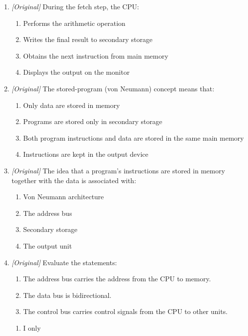 \begin{enumerate}[label=\textbf{Q\arabic*.}, leftmargin=*]
\begin{enumerate}[label=\Alph*.]
    \item Fetch, decode, execute
  \end{enumerate}
\item \textit{[Original]} During the fetch step, the CPU:
  \begin{enumerate}[label=\Alph*.]
    \item Performs the arithmetic operation
    \item Writes the final result to secondary storage
    \item Obtains the next instruction from main memory
    \item Displays the output on the monitor
  \end{enumerate}
\item \textit{[Original]} The stored-program (von Neumann) concept means
  that:
  \begin{enumerate}[label=\Alph*.]
    \item Only data are stored in memory
    \item Programs are stored only in secondary storage
    \item Both program instructions and data are stored in the same main
      memory
    \item Instructions are kept in the output device
  \end{enumerate}
\item \textit{[Original]} The idea that a program's instructions are stored
  in memory together with the data is associated with:
  \begin{enumerate}[label=\Alph*.]
    \item Von Neumann architecture
    \item The address bus
    \item Secondary storage
    \item The output unit
  \end{enumerate}
\item \textit{[Original]} Evaluate the statements:
  \begin{enumerate}[label=\Roman*.]
    \item The address bus carries the address from the CPU to memory.
    \item The data bus is bidirectional.
    \item The control bus carries control signals from the CPU to other
      units.
  \end{enumerate}
  \begin{enumerate}[label=\Alph*.]
    \item I only

\end{enumerate}
\end{enumerate}
